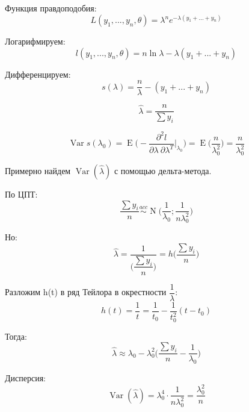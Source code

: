 \documentclass[12pt]{article} %
\theoremstyle{definition} %
\DeclareMathOperator{\Var}{Var}
\DeclareMathOperator{\E}{E}
\DeclareMathOperator{\N}{N}
\def \hlambda{\hat{\lambda}}
\begin{document}
Функция правдоподобия: \begin{equation}
    L(y_1, ..., y_n, \theta)=
    \lambda^n e^{-\lambda (y_1 +  ... + y_n)}
  \end{equation}

Логарифмируем: \begin{equation}
    l(y_1, ..., y_n, \theta)=
    n\ln\lambda - \lambda (y_1 +  ... + y_n)
  \end{equation}
  
Дифференцируем:  \begin{equation}
    s(\lambda)=
    \dfrac{n}{\lambda} - (y_1 +  ... + y_n)
  \end{equation}
  
  \begin{equation}
    \hlambda=
    \dfrac{n}{\sum y_i}
  \end{equation}
  
  \begin{equation}
    \Var s(\lambda_0) =
    \E \Big(-\dfrac{\partial^2 l}{\partial \lambda \: \partial \lambda^T}\Big\rvert_{\lambda_0} \Big) = 
    \E \Big(\dfrac{n}{\lambda_0^2}\Big)=\dfrac{n}{\lambda_0^2}
  \end{equation}
  
  Примерно найдем $\Var (\hlambda)$ с помощью дельта-метода.
  
  \medskip
  
 По ЦПТ:\begin{equation}
    \dfrac{\sum y_i}{n} \stackrel{acc}{\sim} \N \Big(\dfrac{1}{\lambda_0};\dfrac{1}{n\lambda_0^2}\Big)
  \end{equation}
  
 Но:\begin{equation}
    \hlambda = \dfrac{1}{\Big(\dfrac{\sum y_i}{n}\Big)} = h\Big(\dfrac{\sum y_i}{n}\Big)
  \end{equation}
   
 Разложим h(t) в ряд Тейлора в окрестности $\dfrac{1}{\lambda}$:
 \begin{equation}
    h(t) = \dfrac{1}{t} = \dfrac{1}{t_0} - \dfrac{1}{t_0^2}(t-t_0)
  \end{equation}
 
 Тогда:
 \begin{equation}
    \hlambda \approx \lambda_0 - \lambda_0^2 \Big(\dfrac{\sum y_i}{n} - \dfrac{1}{\lambda_0} \Big)
\end{equation}

Дисперсия:
\begin{equation}
    \Var (\hlambda) = \lambda_0^4 \cdot \dfrac{1}{n\lambda_0^2} = \dfrac{\lambda_0^2}{n}
  \end{equation}
  
\end{document}
